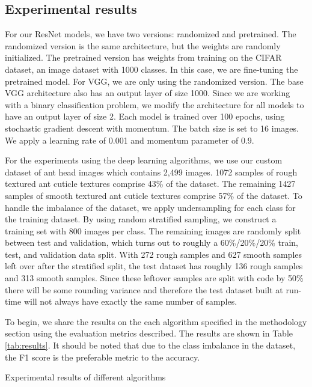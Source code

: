 \documentclass{aci}
\numberwithin{equation}{section}
\begin{document}
\subsection{Experimental results}

For our ResNet models, we have two versions: randomized and pretrained. The
randomized version is the same architecture, but the weights are randomly
initialized. The pretrained version has weights from training on the CIFAR
dataset, an image dataset with 1000 classes. In this case, we are fine-tuning
the pretrained model. For VGG, we are only using the randomized version. The
base VGG architecture also has an output layer of size 1000. Since we are
working with a binary classification problem, we modify the architecture for all
models to have an output layer of size 2. Each model is trained over 100 epochs,
using stochastic gradient descent with momentum. The batch size is set to 16
images. We apply a learning rate of 0.001 and momentum parameter of 0.9.

For the experiments using the deep learning algorithms, we use our custom
dataset of ant head images which contains 2,499 images. 1072 samples of rough
textured ant cuticle textures comprise 43\% of the dataset. The remaining 1427
samples of smooth textured ant cuticle textures comprise 57\% of the dataset. To
handle the imbalance of the dataset, we apply undersampling for each class for
the training dataset. By using random stratified sampling, we construct a
training set with 800 images per class. The remaining images are randomly split
between test and validation, which turns out to roughly a 60\%/20\%/20\% train,
test, and validation data split. With 272 rough samples and 627 smooth samples
left over after the stratified split, the test dataset has roughly 136 rough
samples and 313 smooth samples. Since these leftover samples are split with code
by 50\% there will be some rounding variance and therefore the test dataset
built at run-time will not always have exactly the same number of samples.

To begin, we share the results on the each algorithm specified in the
methodology section using the evaluation metrics described. The results are
shown in Table \ref{tab:results}. It should be noted that due to the class
imbalance in the dataset, the F1 score is the preferable metric to the accuracy.

\begin{table}[h]
    \centering
    \caption{Experimental results of different algorithms}
    
    \label{tab:results}
\end{table}
\end{document}

